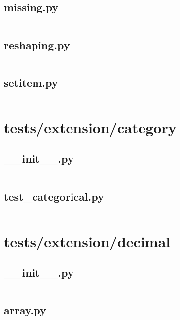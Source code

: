 \documentclass{article}
\begin{document}
\subsection{missing.py}
\inputminted{python}{/home/dufferzafar/dev/@clones/pandas/pandas/tests/extension/base/missing.py}
\newpage

\subsection{reshaping.py}
\inputminted{python}{/home/dufferzafar/dev/@clones/pandas/pandas/tests/extension/base/reshaping.py}
\newpage

\subsection{setitem.py}
\inputminted{python}{/home/dufferzafar/dev/@clones/pandas/pandas/tests/extension/base/setitem.py}
\newpage

\section{tests/extension/category}

\subsection{\_\_init\_\_.py}
\inputminted{python}{/home/dufferzafar/dev/@clones/pandas/pandas/tests/extension/category/__init__.py}
\newpage

\subsection{test\_categorical.py}
\inputminted{python}{/home/dufferzafar/dev/@clones/pandas/pandas/tests/extension/category/test_categorical.py}
\newpage

\section{tests/extension/decimal}

\subsection{\_\_init\_\_.py}
\inputminted{python}{/home/dufferzafar/dev/@clones/pandas/pandas/tests/extension/decimal/__init__.py}
\newpage

\subsection{array.py}
\inputminted{python}{/home/dufferzafar/dev/@clones/pandas/pandas/tests/extension/decimal/array.py}
\newpage
\end{document}
